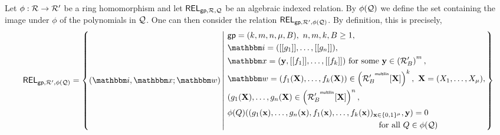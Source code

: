 \documentclass[11pt,letterpaper,usenames,dvipsnames]{article}
\begin{document}
    

    

    Let $\phi:\mathcal{R}\to \mathcal{R}'$ be a ring homomorphism and let $\mathsf{REL}_{\mathsf{gp},\mathcal{R}, \mathcal{Q}}$ be an algebraic indexed relation. By $\phi(\mathcal{Q})$ we define the set containing the image under $\phi$ of the polynomials in $\mathcal{Q}$. One can then consider the relation $\mathsf{REL}_{\mathsf{gp},\mathcal{R}', \phi(\mathcal{Q})}$. By definition, this is precisely, 
    \begin{equation*}
    \begin{aligned}
    \REL_{\gparams,\R',\phi(\cQ)} = \left\{ (\idx, \inp ; \wit)\left| \ \begin{aligned}
    &\gparams = (k,m,n,\mu, B),\ n,m,k,B\geq 1, \\
    &\idx = (\oracle{g_1},\ldots, \oracle{g_n}), \\
    &\inp =(\yy, \oracle{f_1}, \ldots, \oracle{f_k}) \text{ for some } \yy\in \left(\R_B'\right)^{m},\\
        &\wit = (f_1(\XX), \ldots, f_k(\XX)) \in \left(\R_B'{}^{^{\multilin}}[\XX]\right)^{k}, \  \XX=(X_1,\ldots, X_\mu),\\
        &(g_1(\XX),\dots,g_n(\XX)\in \left(\R_B'{}^{^{\multilin}}[\XX]\right)^{n},\\
        &\phi(Q)((g_1(\xx),\ldots, g_n(\xx), f_1(\xx),\ldots, f_k(\xx))_{\xx\in \BB^\mu}, \yy) =0 \\ &\quad\quad\quad\quad\quad\quad\quad \quad\quad\quad\quad\quad\quad\quad\quad\quad\quad\quad\text{ for all } Q\in \phi(\cQ)
    \end{aligned} \right.\right\}
    \end{aligned}
    \end{equation*}
\end{document}
